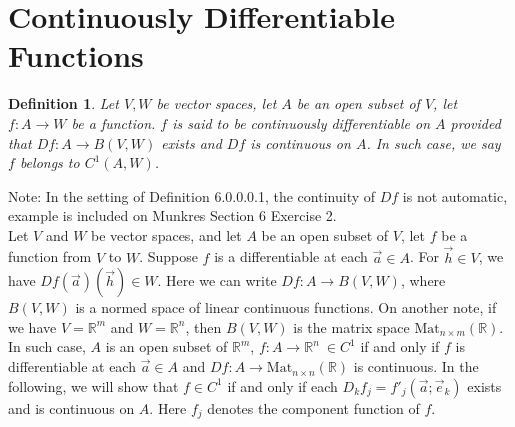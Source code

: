 \documentclass[15pt]{book}
\theoremstyle{break}
\theoremstyle{break}
\newtheorem{defn}{Definition}[corL]
\newcommand{\R}{\mathbb{R}}
\newcommand{\note}{\color{red}Note: \color{black}}
\begin{document}
\section[Continuously Differentiable Functions]{\color{red}Continuously Differentiable Functions \color{black}}
\begin{defn}
Let $V,W$ be vector spaces, let $A$ be an open subset of $V$, let $f:A \to W$ be a function. $f$ is said to be continuously differentiable on $A$ provided that $Df:A \to B(V,W)$ exists and $Df$ is continuous on $A$. In such case, we say $f$ belongs to $C^1(A,W)$.
\end{defn}
\note In the setting of Definition 6.0.0.0.1, the continuity of $Df$ is not automatic, example is included on Munkres Section 6 Exercise 2.\\

\hfill\break
Let $V$ and $W$ be vector spaces, and let $A$ be an open subset of $V$, let $f$ be a function from $V$ to $W$. Suppose $f$ is a differentiable at each $\vec{a}\in A$. For $\vec{h}\in V$, we have $Df(\vec{a})(\vec{h}) \in W$. Here we can write $Df:A \to B(V,W)$, where $B(V,W)$ is a normed space of linear continuous functions. On another note, if we have $V = \R^m$ and $W = \R^n$, then $B(V,W)$ is the matrix space $\text{Mat}_{n\times m}(\R)$. In such case, $A$ is an open subset of $\R^m$, $f:A \to \R^n \ \in C^1$ if and only if $f$ is differentiable at each $\vec{a}\in A$ and  $Df:A \to \text{Mat}_{n\times n}(\R)$ is continuous. In the following, we will show that $f \in C^1$ if and only if each $D_kf_j=f'_j(\vec{a};\vec{e}_k)$ exists and is continuous on $A$. Here $f_j$ denotes the component function of $f$.
\end{document}
